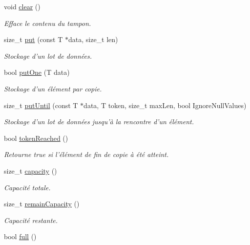 \begin{DoxyCompactItemize}
void \hyperlink{classmdt_buffer_a697920838a6c786209607c2b6ac0858a}{clear} ()
\begin{DoxyCompactList}\small\item\em Efface le contenu du tampon. \end{DoxyCompactList}\item 
size\-\_\-t \hyperlink{classmdt_buffer_abe03f0413ff7512d63d8df1408c66f63}{put} (const T $\ast$data, size\-\_\-t len)
\begin{DoxyCompactList}\small\item\em Stockage d'un lot de données. \end{DoxyCompactList}\item 
bool \hyperlink{classmdt_buffer_a2b9fd3a6b593c2e874249aba5c305e34}{put\-One} (T data)
\begin{DoxyCompactList}\small\item\em Stockage d'un élément par copie. \end{DoxyCompactList}\item 
size\-\_\-t \hyperlink{classmdt_buffer_a7beeb199f0cce529549e61ff949a9ffa}{put\-Until} (const T $\ast$data, T token, size\-\_\-t max\-Len, bool Ignore\-Null\-Values)
\begin{DoxyCompactList}\small\item\em Stockage d'un lot de données jusqu'à la rencontre d'un élément. \end{DoxyCompactList}\item 
bool \hyperlink{classmdt_buffer_a6ddc3c27c154fbfd077f83d5bfe82a19}{token\-Reached} ()
\begin{DoxyCompactList}\small\item\em Retourne true si l'élément de fin de copie à été atteint. \end{DoxyCompactList}\item 
size\-\_\-t \hyperlink{classmdt_buffer_aa6eddf7ccc533da855ebd112202a656f}{capacity} ()
\begin{DoxyCompactList}\small\item\em Capacité totale. \end{DoxyCompactList}\item 
size\-\_\-t \hyperlink{classmdt_buffer_a78e8317b6ba09e9c4e26358e27f75fd6}{remain\-Capacity} ()
\begin{DoxyCompactList}\small\item\em Capacité restante. \end{DoxyCompactList}\item 
bool \hyperlink{classmdt_buffer_a63e2b6b5e7656a5285d0ea1d152ea499}{full} ()

\end{DoxyCompactItemize}
